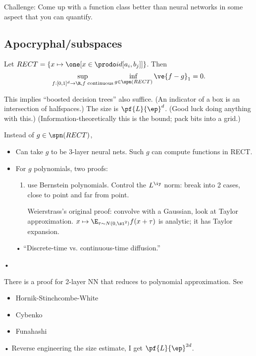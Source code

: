 
Challenge: Come up with a function class better than neural networks in some aspect that you can quantify.

\subsection{Apocryphal/subspaces}

\begin{thm}
Let $RECT  = \{x\mapsto \one[x\in \prodo id [a_i,b_j]]\}$. Then
$$
\sup_{f:[0,1]^d\to \R, f\text{ continuous}} \inf_{g\in \spn(RECT)} \ve{f-g}_1=0.
$$
\end{thm}
This implies ``boosted decision trees'' also suffice. (An indicator of a box is an intersection of halfspaces.) The size is $\pf{L}{\ep}^d$. (Good luck doing anything with this.) (Information-theoretically this is the bound; pack bits into a grid.)

Instead of $g\in \spn(RECT)$, 
\begin{itemize}
\item
Can take $g$ to be 3-layer neural nets. Such $g$ can compute functions in RECT.
\item
For $g$ polynomials, two proofs: 
\begin{enumerate}
\item
use Bernstein polynomials. Control the $L^\iy$ norm: break into 2 cases, close to point and far from point. 

Weierstrass's original proof: convolve with a Gaussian, look at Taylor approximation. $x\mapsto \E_{\tau\sim N(0,\si^2)} f(x+\tau)$ is analytic; it has Taylor expansion.
\end{enumerate}•
``Discrete-time vs. continuous-time diffusion.''
\end{itemize}•

There is a proof for 2-layer NN that reduces to polynomial approximation. See
\begin{itemize}
\item
Hornik-Stinchcombe-White \cite{hornik1989multilayer}
\item
Cybenko \cite{cybenko1989approximation}
\item
Funahashi \cite{funahashi1989approximate}
\end{itemize}•
Reverse engineering the size estimate, I get $\pf{L}{\ep}^{2d}$.

